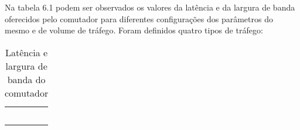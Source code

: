 Na tabela 6.1 podem ser observados os valores da latência e da largura de banda oferecidos pelo comutador para diferentes configurações dos parâmetros do mesmo e de volume de tráfego. Foram definidos quatro tipos de tráfego:

\begin{table}[h]
\begin{center}
\begin{tabular}{|l|l|}

    \hline
    &    \\
    \hline
     & \\
    \hline
     &   \\
    \hline
     &   \\
    \hline
     &  \\
    \hline
     &  \\
    \hline
    
\end{tabular}
\end{center}
\caption{Latência e largura de banda do comutador}\label{Latência e largura de banda do comuatdor}
\end{table}

